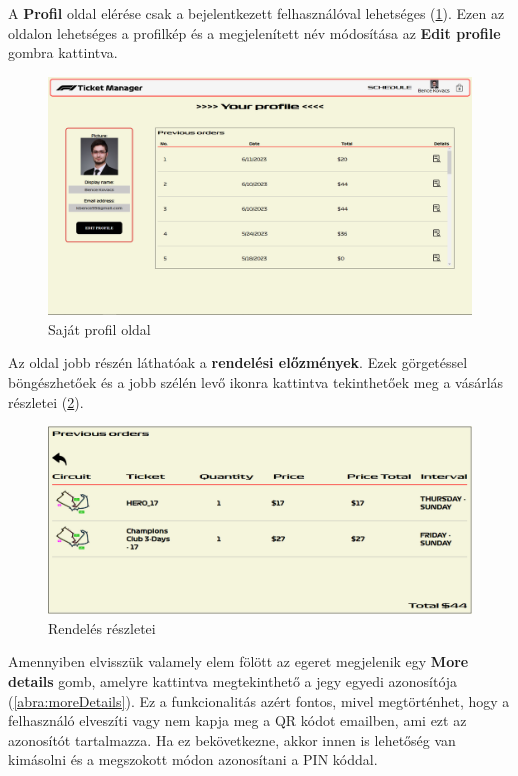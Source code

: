 A \textbf{Profil} oldal elérése csak a bejelentkezett felhasználóval lehetséges (\ref{abra:profile}). Ezen az oldalon lehetséges a profilkép és a megjelenített név módosítása az \textbf{Edit profile} gombra kattintva.

\begin{figure}[!h]
	\centering
	\includegraphics[scale=0.2]{images/profile}
	\caption{Saját profil oldal}
	\label{abra:profile}
\end{figure}

Az oldal jobb részén láthatóak a \textbf{rendelési előzmények}. Ezek görgetéssel böngészhetőek és a jobb szélén levő ikonra kattintva tekinthetőek meg a vásárlás részletei (\ref{abra:previousOrders}).

\begin{figure}[!h]
	\centering
	\includegraphics[scale=0.3]{images/previousOrders}
	\caption{Rendelés részletei}
	\label{abra:previousOrders}
\end{figure}

Amennyiben elvisszük valamely elem fölött az egeret megjelenik egy \textbf{More details} gomb, amelyre kattintva megtekinthető a jegy egyedi azonosítója (\ref{abra:moreDetails}). Ez a funkcionalitás azért fontos, mivel megtörténhet, hogy a felhasználó elveszíti vagy nem kapja meg a QR kódot emailben, ami ezt az azonosítót tartalmazza. Ha ez bekövetkezne, akkor innen is lehetőség van kimásolni és a megszokott módon azonosítani a PIN kóddal.

